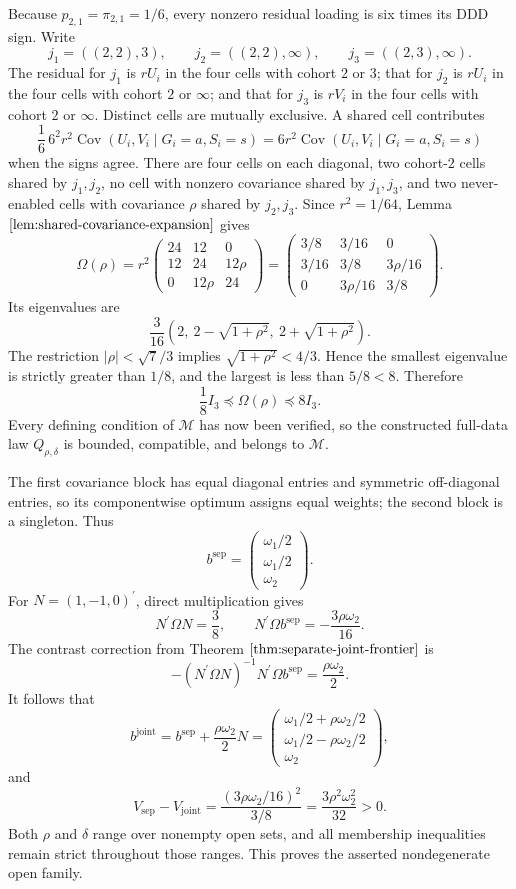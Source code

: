 Because \(p_{2,1}=\pi_{2,1}=1/6\), every nonzero residual loading is six times its DDD sign.  Write
\[
 j_1=((2,2),3),\qquad
 j_2=((2,2),\infty),\qquad
 j_3=((2,3),\infty).
\]
The residual for \(j_1\) is \(rU_i\) in the four cells with cohort \(2\) or \(3\); that for \(j_2\) is \(rU_i\) in the four cells with cohort \(2\) or \(\infty\); and that for \(j_3\) is \(rV_i\) in the four cells with cohort \(2\) or \(\infty\).  Distinct cells are mutually exclusive.  A shared cell contributes
\[
 \frac16\,6^2r^2\operatorname{Cov}(U_i,V_i\mid G_i=a,S_i=s)
 =6r^2\operatorname{Cov}(U_i,V_i\mid G_i=a,S_i=s)
\]
when the signs agree.  There are four cells on each diagonal, two cohort-\(2\) cells shared by \(j_1,j_2\), no cell with nonzero covariance shared by \(j_1,j_3\), and two never-enabled cells with covariance \(\rho\) shared by \(j_2,j_3\).  Since \(r^2=1/64\), Lemma \(\ref{lem:shared-covariance-expansion}\) gives
\[
 \Omega(\rho)=r^2
 \begin{pmatrix}
 24&12&0\\
 12&24&12\rho\\
 0&12\rho&24
 \end{pmatrix}
 =
 \begin{pmatrix}
 3/8&3/16&0\\
 3/16&3/8&3\rho/16\\
 0&3\rho/16&3/8
 \end{pmatrix}.
\]
Its eigenvalues are
\[
 \frac3{16}\left(2,\ 2-\sqrt{1+\rho^2},\ 2+\sqrt{1+\rho^2}\right).
\]
The restriction \(|\rho|<\sqrt7/3\) implies \(\sqrt{1+\rho^2}<4/3\).  Hence the smallest eigenvalue is strictly greater than \(1/8\), and the largest is less than \(5/8<8\).  Therefore
\[
 \frac18I_3\preceq\Omega(\rho)\preceq8I_3.
\]
Every defining condition of \(\mathcal M\) has now been verified, so the constructed full-data law \(Q_{\rho,\delta}\) is bounded, compatible, and belongs to \(\mathcal M\).

The first covariance block has equal diagonal entries and symmetric off-diagonal entries, so its componentwise optimum assigns equal weights; the second block is a singleton.  Thus
\[
 b^{\mathrm{sep}}=
 \begin{pmatrix}\omega_1/2\\ \omega_1/2\\ \omega_2\end{pmatrix}.
\]
For \(N=(1,-1,0)^{\prime}\), direct multiplication gives
\[
 N^{\prime}\Omega N=\frac38,
 \qquad
 N^{\prime}\Omega b^{\mathrm{sep}}=-\frac{3\rho\omega_2}{16}.
\]
The contrast correction from Theorem \(\ref{thm:separate-joint-frontier}\) is
\[
 -(N^{\prime}\Omega N)^{-1}N^{\prime}\Omega b^{\mathrm{sep}}
 =\frac{\rho\omega_2}{2}.
\]
It follows that
\[
 b^{\mathrm{joint}}
 =b^{\mathrm{sep}}+\frac{\rho\omega_2}{2}N
 =\begin{pmatrix}
 \omega_1/2+\rho\omega_2/2\\
 \omega_1/2-\rho\omega_2/2\\
 \omega_2
 \end{pmatrix},
\]
and
\[
 V_{\mathrm{sep}}-V_{\mathrm{joint}}
 =\frac{(3\rho\omega_2/16)^2}{3/8}
 =\frac{3\rho^2\omega_2^2}{32}>0.
\]
Both \(\rho\) and \(\delta\) range over nonempty open sets, and all membership inequalities remain strict throughout those ranges.  This proves the asserted nondegenerate open family.